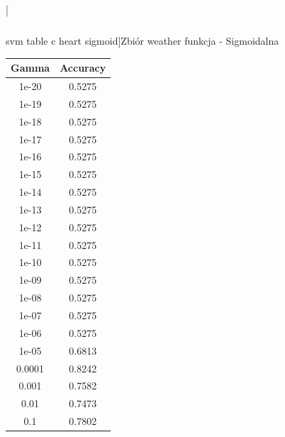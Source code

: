 \documentclass{classrep}
\begin{document}
{{\begin{table}[!htbp]
\begin{minipage}{.3\textwidth}
\begin{tabular}{|c|c|}
                    \end{tabular}
                    \caption
                    [svm table c heart sigmoid]{Zbiór weather funkcja - Sigmoidalna}
                    \label{svm_table_c_heart_sigmoid}
                \end{minipage}
            \end{table}
            \FloatBarrier
            \begin{table}[!htbp]
                \begin{minipage}{.35\textwidth}
                    \centering
                    \begin{tabular}{|c|c|}
                        \hline
                        Gamma & Accuracy \\ \hline
                        1e-20 & 0.5275 \\ \hline
                        1e-19 & 0.5275 \\ \hline
                        1e-18 & 0.5275 \\ \hline
                        1e-17 & 0.5275 \\ \hline
                        1e-16 & 0.5275 \\ \hline
                        1e-15 & 0.5275 \\ \hline
                        1e-14 & 0.5275 \\ \hline
                        1e-13 & 0.5275 \\ \hline
                        1e-12 & 0.5275 \\ \hline
                        1e-11 & 0.5275 \\ \hline
                        1e-10 & 0.5275 \\ \hline
                        1e-09 & 0.5275 \\ \hline
                        1e-08 & 0.5275 \\ \hline
                        1e-07 & 0.5275 \\ \hline
                        1e-06 & 0.5275 \\ \hline
                        1e-05 & 0.6813 \\ \hline
                        0.0001 & 0.8242 \\ \hline
                        0.001 & 0.7582 \\ \hline
                        0.01 & 0.7473 \\ \hline
                        0.1 & 0.7802 \\ \hline
                    \end{tabular}

\end{minipage}
\end{table}}}
\end{document}
